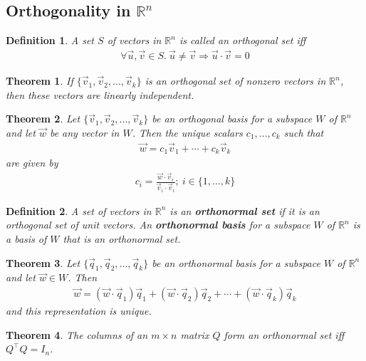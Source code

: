 \documentclass{article}
\theoremstyle{sltheorem}
\newtheorem{definition}{Definition}[section]
\newtheorem{theorem}{Theorem}[section]
\begin{document}
\subsection{Orthogonality in $\mathbb{R}^n$}
\begin{definition}
    A set $S$ of vectors in $\mathbb{R}^n$ is called an orthogonal set iff
    \begin{align*}
        \forall \vec u, \vec v\in S.\: \vec u \not= \vec v \Rightarrow \vec u \cdot \vec v = 0
    \end{align*}
\end{definition}
\begin{theorem}
    If $\{\vec v_1, \vec v_2, ...,\vec v_k\}$ is an orthogonal set of nonzero vectors in $\mathbb{R}^n$, then these vectors are linearly independent.
\end{theorem}
\begin{theorem}
    Let $\{\vec v_1, \vec v_2, ..., \vec v_k\}$ be an orthogonal basis for a subspace $W$ of $\mathbb{R}^n$ and let $\vec w$ be any vector in $W$. Then the unique scalars $c_1, ..., c_k$ such that
    \begin{align*}
        \vec w = c_1\vec v_1 + \cdots + c_k\vec v_k
    \end{align*}
    are given by
    \begin{align*}
        c_i = \frac{\vec w \cdot \vec v_i}{\vec v_i \cdot \vec v_i}; \: i \in \{1, ..., k\}
    \end{align*}
\end{theorem}
\begin{definition}
    A set of vectors in $\mathbb{R}^n$ is an \textbf{orthonormal set} if it is an orthogonal set of unit vectors. An \textbf{orthonormal basis} for a subspace $W$ of $\mathbb{R}^n$ is a basis of $W$ that is an orthonormal set. 
\end{definition}
\begin{theorem}
    Let $\{\vec q_1, \vec q_2, ..., \vec q_k\}$ be an orthonormal basis for a subspace $W$ of $\mathbb{R}^n$ and let $\vec w\in W$. Then
    \begin{align*}
        \vec w = (\vec w \cdot \vec q_1)\vec q_1 + (\vec w\cdot\vec q_2)\vec q_2 + \cdots + (\vec w\cdot\vec q_k)\vec q_k
    \end{align*}
    and this representation is unique.
\end{theorem}
\begin{theorem}
    The columns of an $m\times n$ matrix $Q$ form an orthonormal set iff $Q^\intercal Q=I_n$.
\end{theorem}
\end{document}
